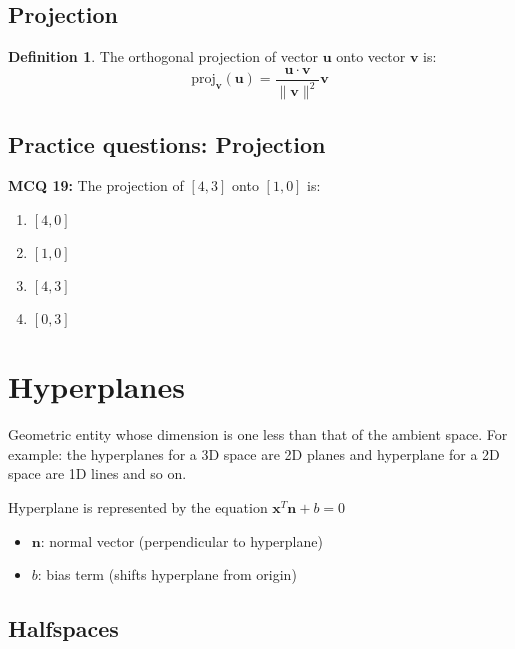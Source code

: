 \documentclass[11pt,a4paper]{article}
\theoremstyle{definition}
\newtheorem{definition}{Definition}[section]
\begin{document}
\subsection{Projection}

\begin{defbox}
\begin{definition}
The orthogonal projection of vector $\mathbf{u}$ onto vector $\mathbf{v}$ is:
\[\text{proj}_{\mathbf{v}}(\mathbf{u}) = \frac{\mathbf{u} \cdot \mathbf{v}}{\|\mathbf{v}\|^2}\mathbf{v}\]
\end{definition}
\end{defbox}


\subsection{Practice questions: Projection}

\textbf{MCQ 19:} The projection of $[4, 3]$ onto $[1, 0]$ is:

\begin{enumerate}
    \item $[4, 0]$
    \item $[1, 0]$
    \item $[4, 3]$
    \item $[0, 3]$
\end{enumerate}

\section{Hyperplanes}

Geometric entity whose dimension is one less than that of the ambient space. 
For example: the hyperplanes for a 3D space are 2D planes and hyperplane for a 2D space are 1D lines and so on.


\noindent Hyperplane is represented by the equation $\mathbf{x}^T \mathbf{n} + b = 0$

\begin{itemize}
    \item $\mathbf{n}$: normal vector (perpendicular to hyperplane)
    \item $b$: bias term (shifts hyperplane from origin)
\end{itemize}

\subsection{Halfspaces}
\end{document}
